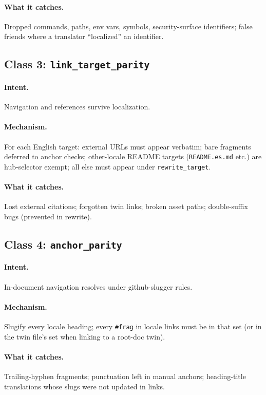 \documentclass[11pt]{article}
\theoremstyle{definition}
\theoremstyle{plain}
\theoremstyle{remark}
\begin{document}
\paragraph{What it catches.} Dropped commands, paths, env vars, symbols,
security-surface identifiers; false friends where a translator ``localized''
an identifier.

\subsection{Class 3: \texttt{link\_target\_parity}}

\paragraph{Intent.} Navigation and references survive localization.

\paragraph{Mechanism.} For each English target: external URLs must appear
verbatim; bare fragments deferred to anchor checks; other-locale README
targets (\texttt{README.es.md} etc.) are hub-selector exempt; all else must
appear under \texttt{rewrite\_target}.

\paragraph{What it catches.} Lost external citations; forgotten twin links;
broken asset paths; double-suffix bugs (prevented in rewrite).

\subsection{Class 4: \texttt{anchor\_parity}}

\paragraph{Intent.} In-document navigation resolves under github-slugger
rules.

\paragraph{Mechanism.} Slugify every locale heading; every \texttt{\#frag}
in locale links must be in that set (or in the twin file's set when linking
to a root-doc twin).

\paragraph{What it catches.} Trailing-hyphen fragments; punctuation left in
manual anchors; heading-title translations whose slugs were not updated in
links.
\end{document}
